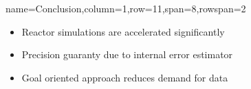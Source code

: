 \documentclass[
	accentcolor=3c,
	boxstyle=colored, %
	colorback=false,
	title=small
	]{tudasciposter}
\begin{document}
\begin{tcbposter}[
	poster={
		columns=8,
		rows=12,
		spacing=1cm,
	},]
\begin{posterboxenv}[title=4. Conclusion]{name=Conclusion,column=1,row=11,span=8,rowspan=2}
\begin{multicols}{2}		
	\begin{itemize}
		\item Reactor simulations are accelerated significantly
		\item Precision guaranty due to internal error estimator
		\item Goal oriented approach reduces demand for data
	\end{itemize}
\end{multicols}

\end{posterboxenv}

\end{tcbposter}
\end{document}
